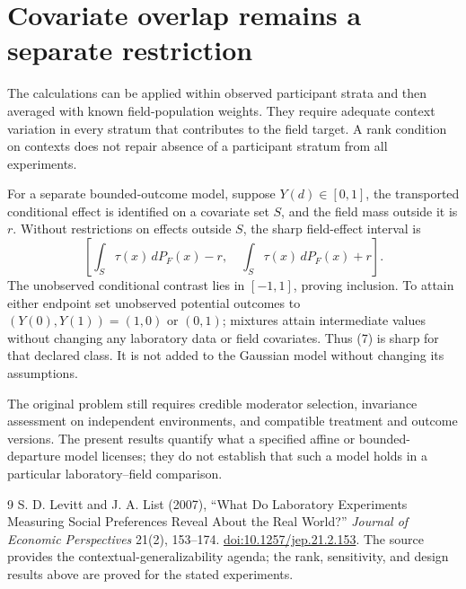 \documentclass[11pt,a4paper]{article}
\theoremstyle{remark}
\begin{document}
\section{Covariate overlap remains a separate restriction}
The calculations can be applied within observed participant strata and then averaged with known field-population weights. They require adequate context variation in every stratum that contributes to the field target. A rank condition on contexts does not repair absence of a participant stratum from all experiments.

For a separate bounded-outcome model, suppose $Y(d)\in[0,1]$, the transported conditional effect is identified on a covariate set $S$, and the field mass outside it is $r$. Without restrictions on effects outside $S$, the sharp field-effect interval is
\[
 \left[\int_S\tau(x)\,dP_F(x)-r,\quad
       \int_S\tau(x)\,dP_F(x)+r\right]. \tag{7}
\]
The unobserved conditional contrast lies in $[-1,1]$, proving inclusion. To attain either endpoint set unobserved potential outcomes to $(Y(0),Y(1))=(1,0)$ or $(0,1)$; mixtures attain intermediate values without changing any laboratory data or field covariates. Thus (7) is sharp for that declared class. It is not added to the Gaussian model without changing its assumptions.

The original problem still requires credible moderator selection, invariance assessment on independent environments, and compatible treatment and outcome versions. The present results quantify what a specified affine or bounded-departure model licenses; they do not establish that such a model holds in a particular laboratory--field comparison.

\begin{thebibliography}{9}
 S. D. Levitt and J. A. List (2007), ``What Do Laboratory Experiments Measuring Social Preferences Reveal About the Real World?'' \emph{Journal of Economic Perspectives} 21(2), 153--174. \href{https://doi.org/10.1257/jep.21.2.153}{doi:10.1257/jep.21.2.153}. The source provides the contextual-generalizability agenda; the rank, sensitivity, and design results above are proved for the stated experiments.
\end{thebibliography}
\end{document}
